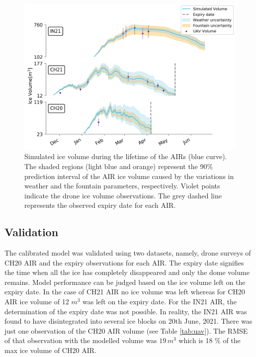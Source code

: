 \documentclass[utf8]{frontiersSCNS}
\begin{document}
\begin{figure}
	\begin{center}
		\includegraphics[width=\linewidth]{Figures/Figure_6.jpg}
	\end{center}
	\caption{Simulated ice volume during the lifetime of the AIRs (blue curve). The shaded regions (light blue and
		orange) represent the 90\% prediction interval of the AIR ice volume caused by the variations in weather and
    the fountain parameters, respectively. Violet points indicate the drone ice volume observations.  The grey
  dashed line represents the observed expiry date for each AIR.  }
	\label{fig:results}
\end{figure}

\subsection{Validation}

The calibrated model was validated using two datasets, namely, drone surveys of CH20 AIR and the expiry
observations for each AIR. The expiry date signifies the time when all the ice has completely disappeared and
only the dome volume remains. Model performance can be judged based on the  ice volume left on the expiry date.
In the case of CH21 AIR no ice volume was left whereas for CH20 AIR ice volume of 12 $m^3$ was left on the
expiry date. For the IN21 AIR, the determination of the expiry date was not possible. In reality, the IN21 AIR
was found to have disintegrated into several ice blocks on 20th June, 2021.  There was just one observation of
the CH20 AIR volume (see Table \ref{tab:uav}). The RMSE of that observation with the modelled volume was $19\,
m^3$ which is 18 \% of the max ice volume of CH20 AIR.
\end{document}
